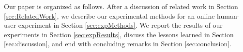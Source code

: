 
 Our paper is organized as follows.  After a discussion of related work in Section \ref{sec:RelatedWork}, we describe our experimental methods for an online human-user experiment in Section \ref{sec:expMethods}.  We report the results of our experiments in Section \ref{sec:expResults}, discuss the lessons learned in Section \ref{sec:discussion}, and end with concluding remarks in Section \ref{sec:conclusion}.


